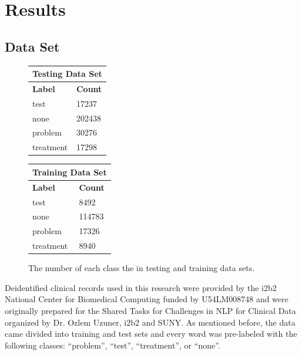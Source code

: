 \documentclass[preprint]{style}
\begin{document}
\section{Results}

\subsection{Data Set}

\begin{figure}[t]
\begin{center}
\begin{center}
	\begin{tabular}{|l|l|}
	\hline
	\multicolumn{2}{|c|}{\bf Testing Data Set} \\ \hline
	{\bf Label} & {\bf Count}  \\ \hline
	test & 17237 \\ \hline
	none & 202438 \\ \hline
	 problem & 30276 \\ \hline
	 treatment & 17298 \\ \hline
	\end{tabular}
\end{center}

\begin{center}
	\begin{tabular}{|l|l|}
	\hline
	\multicolumn{2}{|c|}{\bf Training Data Set} \\ \hline
	{\bf Label} & {\bf Count}  \\ \hline
	test & 8492 \\ \hline
	none & 114783 \\ \hline
	 problem & 17326 \\ \hline
	 treatment & 8940 \\ \hline
	\end{tabular}
\end{center}
\end{center}
\caption{The number of each class the in testing and training data sets.}
\label{fig:data_set_counts}
\end{figure}


Deidentified clinical records used in this research were provided by the i2b2 National Center for Biomedical Computing funded by U54LM008748 and were originally prepared for the Shared Tasks for Challenges in NLP for Clinical Data organized by Dr. Ozlem Uzuner, i2b2 and SUNY. As mentioned before, the data came divided into training and test sets and every word was pre-labeled with the following classes: ``problem'', ``test'', ``treatment'', or ``none''. 
\end{document}

